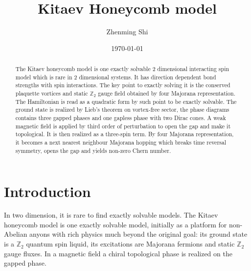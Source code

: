 \documentclass[
  aps,
  prl,
  reprint,
  amsmath,
  amssymb,
  superscriptaddress,
  floatfix
]{revtex4-2}
\begin{document}
\title{Kitaev Honeycomb model}

\author{Zhenming Shi}

\date{\today}

\begin{abstract}
The Kitaev honeycomb model is one exactly solvable 2 dimensional interacting spin model which is rare in 2 dimensional systems.
It has direction dependent bond strengths with spin interactions. The key point to exactly solving it is the conserved plaquette vortices and static $\mathbb{Z}_2$ gauge field obtained by four Majorana representation. The Hamiltonian is read as a quadratic form by such point to be exactly solvable. 
The ground state is realized by Lieb's theorem on vortex-free sector, the phase diagrams contains three gapped phases and one gapless phase with two Dirac cones. A weak magnetic field is applied by third order of perturbation to open the gap and make it topological. It is then realized as a three-spin term. 
By four Majorana representation, it becomes a next nearest neighbour Majorana hopping which breaks time reversal symmetry, opens the gap and yields non-zero Chern number.
\end{abstract}

\maketitle

\raggedbottom

\setcounter{secnumdepth}{3}

\section{Introduction}
\label{sec:intro}
In two dimension, it is rare to find exactly solvable models. The Kitaev honeycomb model \cite{Kitaev2006} is one exactly solvable model, initially as a platform for non-Abelian anyons with rich physics much beyond the original goal: its ground state is a $\mathbb{Z}_2$ quantum spin liquid, its excitations are Majorana fermions and static $\mathbb{Z}_2$ gauge fluxes. In a magnetic field a chiral topological phase is realized on the gapped phase.
\end{document}
